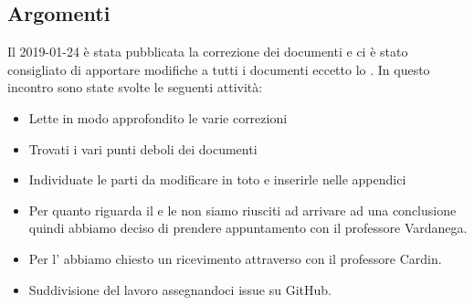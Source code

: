         \subsection{Argomenti}
            Il 2019-01-24 è stata pubblicata la correzione dei documenti e ci è stato consigliato di apportare modifiche a tutti i documenti eccetto lo \SdFd.
            In questo incontro sono state svolte le seguenti attività:
            \begin{itemize}
                \item Lette in modo approfondito le varie correzioni
                \item Trovati i vari punti deboli dei documenti
                \item Individuate le parti da modificare in toto e inserirle nelle appendici
                \item Per quanto riguarda il  e le  non siamo riusciti ad arrivare ad una conclusione quindi abbiamo deciso di prendere appuntamento con il professore Vardanega. 
                \item Per l' abbiamo chiesto un ricevimento attraverso  con il professore Cardin.
                \item Suddivisione del lavoro assegnandoci issue su GitHub.
        \end{itemize}

